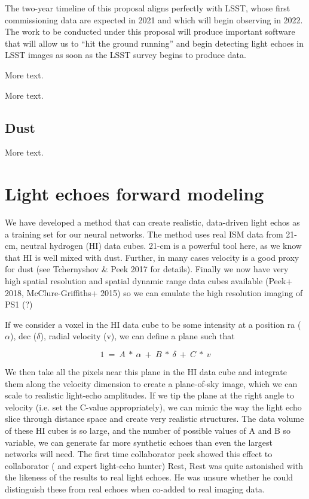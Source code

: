 \documentclass{proposalnsf}
\begin{document}
The two-year timeline of this proposal aligns perfectly with LSST, whose  first commissioning data are expected in 2021 and which will begin observing in 2022.  The work to be conducted under this proposal will produce important software that will allow us to “hit the ground running” and begin detecting light echoes in LSST images as soon as the LSST survey begins to produce data. 

More text.


More text.
\subsection{Dust}

More text.

\section{Light echoes forward modeling}\label{sec:fwm}

We have developed a method that can create realistic, data-driven light echos as a training set for our neural networks. The method uses real ISM data from 21-cm, neutral hydrogen (HI)  data cubes. 21-cm is a powerful tool here, as we know that HI is well mixed with dust. Further, in many cases velocity is a good proxy for dust (see Tchernyshov & Peek 2017 for details). Finally we now have very high spatial resolution and spatial dynamic range data cubes available (Peek+ 2018, McClure-Griffiths+ 2015) so we can emulate the high resolution imaging of PS1 (?)

If we consider a voxel in the HI data cube to be some intensity at a position ra ($\alpha$), dec ($\delta$), radial velocity (v), we can define a plane such that 

$$1~=~A~*~\alpha~+~B~*~\delta~+~C~*~v$$

We then take all the pixels near this plane in the HI data cube and integrate them along the velocity dimension to create a plane-of-sky image, which we can scale to realistic light-echo amplitudes. If we tip the plane at the right angle to velocity (i.e. set the C-value appropriately), we can mimic the way the light echo slice through distance space and create very realistic structures. The data volume of these HI cubes is so large, and the number of possible values of A and B so variable, we can generate far more synthetic echoes than even the largest networks will need. The first time collaborator peek showed this effect to collaborator ( and expert  light-echo hunter) Rest, Rest was quite astonished with the likeness of the results to real light echoes. He was unsure whether he could distinguish these from real echoes when co-added to real imaging data.
\end{document}
